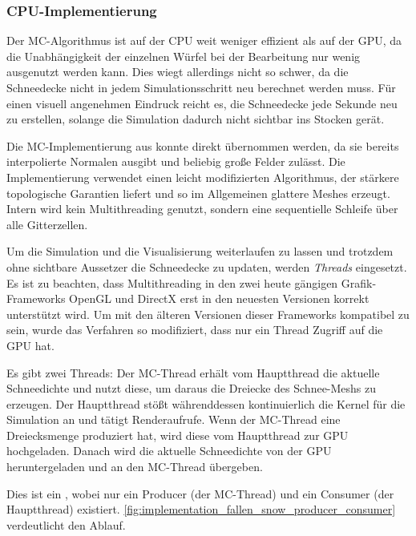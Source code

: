 \subsubsection{CPU-Implementierung}

Der MC-Algorithmus ist auf der CPU weit weniger effizient als auf der
GPU, da die Unabhängigkeit der einzelnen Würfel bei der Bearbeitung
nur wenig ausgenutzt werden kann. Dies wiegt allerdings nicht so
schwer, da die Schneedecke nicht in jedem Simulationsschritt neu
berechnet werden muss. Für einen visuell angenehmen Eindruck reicht
es, die Schneedecke jede Sekunde neu zu erstellen, solange die
Simulation dadurch nicht sichtbar ins Stocken gerät.

Die MC-Implementierung aus \cite{marching_cubes_jgt} konnte direkt
übernommen werden, da sie bereits interpolierte Normalen ausgibt und
beliebig große Felder zulässt. Die Implementierung verwendet einen
leicht modifizierten Algorithmus, der stärkere topologische Garantien
liefert und so im Allgemeinen glattere Meshes erzeugt. Intern wird
kein Multithreading genutzt, sondern eine sequentielle Schleife über
alle Gitterzellen.

Um die Simulation und die Visualisierung weiterlaufen zu lassen und
trotzdem ohne sichtbare Aussetzer die Schneedecke zu updaten, werden
\emph{Threads} eingesetzt. Es ist zu beachten, dass Multithreading in
den zwei heute gängigen Grafik-Frameworks OpenGL und DirectX erst in
den neuesten Versionen korrekt unterstützt wird. Um mit den älteren
Versionen dieser Frameworks kompatibel zu sein, wurde das Verfahren so
modifiziert, dass nur ein Thread Zugriff auf die GPU hat.

Es gibt zwei Threads: Der MC-Thread erhält vom Hauptthread die
aktuelle Schneedichte und nutzt diese, um daraus die Dreiecke des
Schnee-Meshs zu erzeugen. Der Hauptthread stößt währenddessen
kontinuierlich die Kernel für die Simulation an und tätigt
Renderaufrufe. Wenn der MC-Thread eine Dreiecksmenge produziert hat,
wird diese vom Hauptthread zur GPU hochgeladen. Danach wird die
aktuelle Schneedichte von der GPU heruntergeladen und an den MC-Thread
übergeben.

Dies ist ein , wobei nur ein
Producer (der MC-Thread) und ein Consumer (der Hauptthread)
existiert. \autoref{fig:implementation_fallen_snow_producer_consumer} verdeutlicht den Ablauf.

